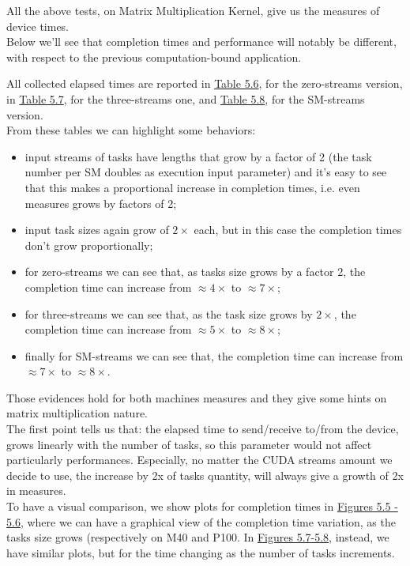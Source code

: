 All the above tests, on Matrix Multiplication Kernel, give us the measures of device times.\\
Below we'll see that completion times and performance will notably be different, with respect to the previous computation-bound application.

All collected elapsed times are reported in \hyperref[tab:matvgszero]{Table 5.6}, for the zero-streams version, in \hyperref[tab:matvgsThree]{Table 5.7}, for the three-streams one, and \hyperref[tab:matvgsSM]{Table 5.8}, for the SM-streams version.\\
From these tables we can highlight some behaviors:
\begin{itemize}
	\item input streams of tasks have lengths that grow by a factor of 2 (the task number per SM doubles as execution input parameter) and it's easy to see that this makes a proportional increase in completion times, i.e. even measures grows by factors of 2;
	
	\item input task sizes again grow of \(2\times\) each, but in this case the completion times don't grow proportionally;
	
	\item for zero-streams we can see that, as tasks size grows by a factor 2, the completion time can increase from \(\approx4\times\) to \(\approx7\times\); 
	
	\item for three-streams we can see that, as the task size grows by \(2\times\), the completion time can increase from \(\approx5\times\) to \(\approx8\times\); 
	
	\item finally for SM-streams we can see that, the completion time can increase from \(\approx7\times\) to \(\approx8\times\).
\end{itemize}
Those evidences hold for both machines measures and they give some hints on matrix multiplication nature.\\
The first point tells us that: the elapsed time to send/receive to/from the device, grows linearly with the number of tasks, so this parameter would not affect particularly performances. Especially, no matter the CUDA streams amount we decide to use, the increase by 2x of tasks quantity, will always give a growth of 2x in measures.\\
To have a visual comparison, we show plots for completion times in \hyperref[fig:matcompsize]{Figures 5.5 - 5.6}, where we can have a graphical view of the completion time variation, as the tasks size grows (respectively on M40 and P100. In \hyperref[fig:matcompnum]{Figures 5.7-5.8}, instead, we have similar plots, but for the time changing as the number of tasks increments.
